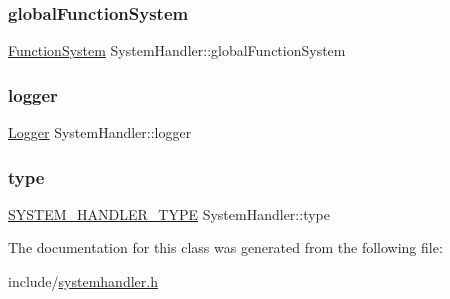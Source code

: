 \subsubsection{\texorpdfstring{global\+Function\+System}{globalFunctionSystem}}
{\footnotesize\ttfamily \hyperlink{classFunctionSystem}{Function\+System} System\+Handler\+::global\+Function\+System\hspace{0.3cm}{\ttfamily [protected]}}

\mbox{\label{classSystemHandler_aff3c17bc71f072c415a793a6114a5e68}} 
\subsubsection{\texorpdfstring{logger}{logger}}
{\footnotesize\ttfamily \hyperlink{classLogger}{Logger} System\+Handler\+::logger\hspace{0.3cm}{\ttfamily [protected]}}

\mbox{\label{classSystemHandler_a8ca6090af683e8555051681fd31cd865}} 
\subsubsection{\texorpdfstring{type}{type}}
{\footnotesize\ttfamily \hyperlink{statics_8h_a28f867553077bc713fdf8921a9226e2e}{S\+Y\+S\+T\+E\+M\+\_\+\+H\+A\+N\+D\+L\+E\+R\+\_\+\+T\+Y\+PE} System\+Handler\+::type\hspace{0.3cm}{\ttfamily [protected]}}



The documentation for this class was generated from the following file\+:\begin{DoxyCompactItemize}
\item 
include/\hyperlink{systemhandler_8h}{systemhandler.\+h}\end{DoxyCompactItemize}
